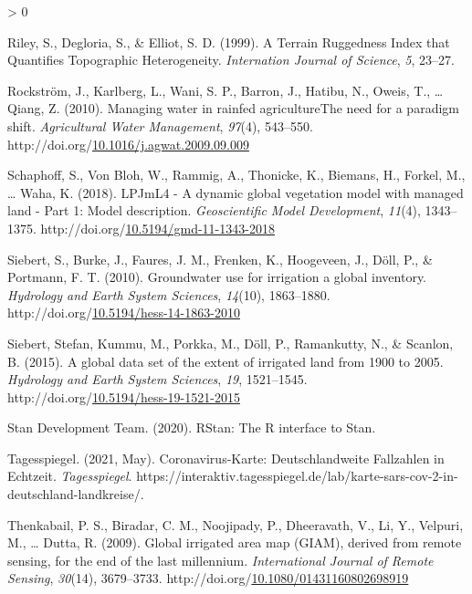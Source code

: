 \documentclass[12pt,twoside]{reedthesis}
\newlength{\cslhangindent}
\newenvironment{CSLReferences}[2] %
 {%
  \setlength{\parindent}{0pt}
  \ifodd #1 \everypar{\setlength{\hangindent}{\cslhangindent}}\ignorespaces\fi
  \ifnum #2 > 0
  \setlength{\parskip}{#2\baselineskip}
  \fi
 }%
 {}
\begin{document}
\begin{CSLReferences}{1}{0}
\leavevmode\hypertarget{ref-rileyTerrainRuggednessIndex1999}{}%
Riley, S., Degloria, S., \& Elliot, S. D. (1999). A {Terrain Ruggedness Index} that {Quantifies Topographic Heterogeneity}. \emph{Internation Journal of Science}, \emph{5}, 23--27.

\leavevmode\hypertarget{ref-rockstromManagingWaterRainfed2010}{}%
Rockström, J., Karlberg, L., Wani, S. P., Barron, J., Hatibu, N., Oweis, T., \ldots{} Qiang, Z. (2010). Managing water in rainfed agriculture{{The}} need for a paradigm shift. \emph{Agricultural Water Management}, \emph{97}(4), 543--550. http://doi.org/\href{https://doi.org/10.1016/j.agwat.2009.09.009}{10.1016/j.agwat.2009.09.009}

\leavevmode\hypertarget{ref-schaphoffLPJmL4DynamicGlobal2018}{}%
Schaphoff, S., Von Bloh, W., Rammig, A., Thonicke, K., Biemans, H., Forkel, M., \ldots{} Waha, K. (2018). {LPJmL4} - {A} dynamic global vegetation model with managed land - {Part} 1: Model description. \emph{Geoscientific Model Development}, \emph{11}(4), 1343--1375. http://doi.org/\href{https://doi.org/10.5194/gmd-11-1343-2018}{10.5194/gmd-11-1343-2018}

\leavevmode\hypertarget{ref-siebertGroundwaterUseIrrigation2010}{}%
Siebert, S., Burke, J., Faures, J. M., Frenken, K., Hoogeveen, J., Döll, P., \& Portmann, F. T. (2010). Groundwater use for irrigation {} a global inventory. \emph{Hydrology and Earth System Sciences}, \emph{14}(10), 1863--1880. http://doi.org/\href{https://doi.org/10.5194/hess-14-1863-2010}{10.5194/hess-14-1863-2010}

\leavevmode\hypertarget{ref-siebertGlobalDataSet2015}{}%
Siebert, Stefan, Kummu, M., Porkka, M., Döll, P., Ramankutty, N., \& Scanlon, B. (2015). A global data set of the extent of irrigated land from 1900 to 2005. \emph{Hydrology and Earth System Sciences}, \emph{19}, 1521--1545. http://doi.org/\href{https://doi.org/10.5194/hess-19-1521-2015}{10.5194/hess-19-1521-2015}

\leavevmode\hypertarget{ref-standevelopmentteamRStanInterfaceStan2020}{}%
Stan Development Team. (2020). {RStan}: The {R} interface to {Stan}.

\leavevmode\hypertarget{ref-tagesspiegelCoronavirusKarteDeutschlandweiteFallzahlen2021}{}%
Tagesspiegel. (2021, May). Coronavirus-{Karte}: Deutschlandweite {Fallzahlen} in {Echtzeit}. \emph{Tagesspiegel}. https://interaktiv.tagesspiegel.de/lab/karte-sars-cov-2-in-deutschland-landkreise/.

\leavevmode\hypertarget{ref-thenkabailGlobalIrrigatedArea2009}{}%
Thenkabail, P. S., Biradar, C. M., Noojipady, P., Dheeravath, V., Li, Y., Velpuri, M., \ldots{} Dutta, R. (2009). Global irrigated area map ({GIAM}), derived from remote sensing, for the end of the last millennium. \emph{International Journal of Remote Sensing}, \emph{30}(14), 3679--3733. http://doi.org/\href{https://doi.org/10.1080/01431160802698919}{10.1080/01431160802698919}


\end{CSLReferences}
\end{document}
